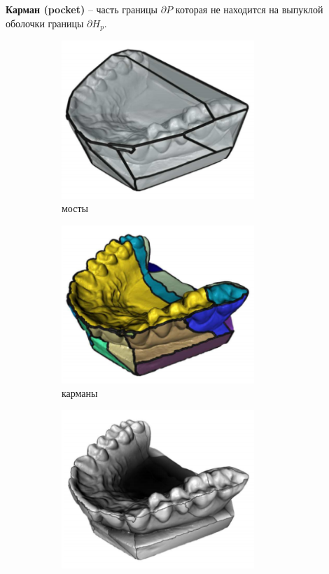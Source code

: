 \documentclass[11pt,a4paper]{extarticle}
\begin{document}
			\textbf{Карман (pocket)} -- часть границы $\partial P$ которая не находится на выпуклой оболочки границы $\partial H_p$.\\
			\begin{figure}[ht]
				\centering
				\begin{subfigure}{2in}
					\includegraphics[width=0.8\textwidth]{teeth1}					
					\caption*{мосты}
				\end{subfigure}
				\begin{subfigure}{2in}
					\includegraphics[width=0.8\textwidth]{teeth2}					
					\caption*{карманы}
				\end{subfigure}
				\begin{subfigure}{2in}
					\includegraphics[width=0.8\textwidth]{teeth3}					

\end{subfigure}
\end{figure}
\end{document}
